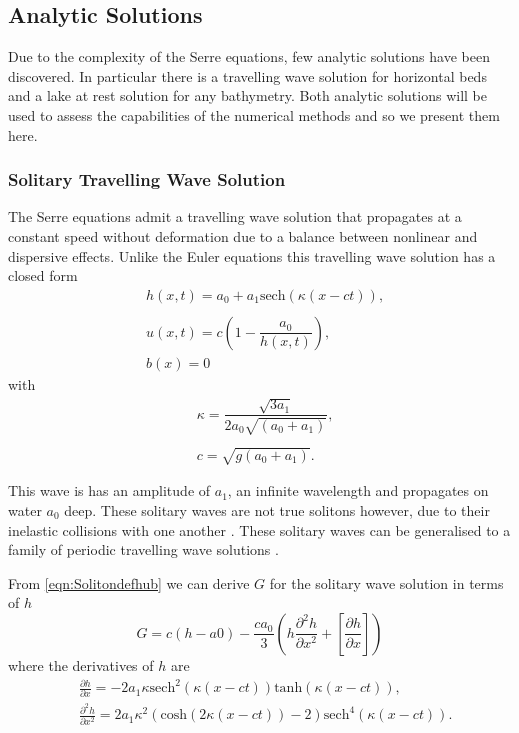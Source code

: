 \subsection{Analytic Solutions}
Due to the complexity of the Serre equations, few analytic solutions have been discovered. In particular there is a travelling wave solution for horizontal beds and a lake at rest solution for any bathymetry. Both analytic solutions will be used to assess the capabilities of the numerical methods and so we present them here. 

\subsubsection{Solitary Travelling Wave Solution}
The Serre equations admit a travelling wave solution that propagates at a constant speed without deformation due to a balance between nonlinear and dispersive effects. Unlike the Euler equations this travelling wave solution has a closed form
\begin{subequations}
	\begin{align}
	&h(x,t) = a_0 + a_1\text{sech}\left(\kappa \left(x - ct\right)\right), \\  \nonumber \\
	&u(x,t) = c\left(1 - \dfrac{a_0}{h(x,t)}\right), \\
	&b(x) = 0
	\end{align}
	\label{eqn:Solitondefhub}
\end{subequations}
with
\begin{align*}
&\kappa = \dfrac{\sqrt{3a_1}}{2 a_0\sqrt{\left(a_0 + a_1\right)}}, \\ \\
&c = \sqrt{g(a_0 + a_1)}.
\end{align*}

This wave is has an amplitude of $a_1$, an infinite wavelength and propagates on water $a_0$ deep. These solitary waves are not true solitons however, due to their inelastic collisions with one another \cite{Dutykh-etal-2013-761}. These solitary waves can be generalised to a family of periodic travelling wave solutions \cite{El-etal-2006}. 

From \eqref{eqn:Solitondefhub} we can derive $G$ for the solitary wave solution in terms of $h$
\begin{equation}
G =c(h - a0) - \frac{ca_0}{3} \left(h\frac{\partial^2 h}{\partial x^2 } + \left[\frac{\partial h}{\partial x }\right] \right)
\label{eqn:SolitondefG}
\end{equation}
where the derivatives of $h$ are
\begin{align*}
&\frac{\partial h}{\partial x } = -2 a_1 \kappa \text{sech}^2\left(\kappa \left(x - ct\right)\right) \text{tanh}\left(\kappa \left(x - ct\right)\right),\\
&\frac{\partial^2 h}{\partial x^2 } =  2a_1 \kappa^2 \left(\text{cosh}\left(2\kappa \left(x - ct\right)\right) -2\right)\text{sech}^4\left(\kappa \left(x - ct\right)\right).
\end{align*}

